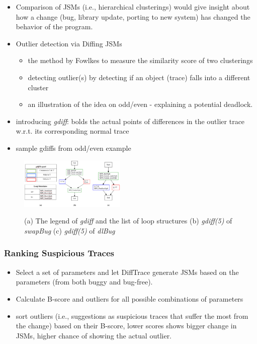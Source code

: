\begin{itemize}
	\item Comparison of JSMs (i.e., hierarchical clusterings) would give insight about how a change (bug, library update, porting to new system) has changed the behavior of the program.
	\item Outlier detection via Diffing JSMs
	\begin{itemize}
		\item the method by Fowlkes to measure the similarity score of two clusterings
		\item detecting outlier(s) by detecting if an object (trace) falls into a different cluster 
		\item an illustration of the idea on odd/even - explaining a potential deadlock.
	\end{itemize}
	\item introducing \textit{gdiff}: bolds the actual points of differences in the outlier trace w.r.t. its corresponding normal trace
	\item sample gdiffs from odd/even example
	
\end{itemize}

\begin{figure}[]
\centering
\caption{(a) The legend of \textit{gdiff} and the list of loop structures (b) \textit{gdiff(5)} of \textit{swapBug} (c) \textit{gdiff(5)} of \textit{dlBug}}
\includegraphics[width=0.45\textwidth]{figs/sampleGdiff.png}
\label{fig.gdiffs}
\end{figure}



\subsubsection{Ranking Suspicious Traces}
\begin{itemize}
	\item Select a set of parameters and let DiffTrace generate JSMs based on the parameters (from both buggy and bug-free).
	\item Calculate B-score and outliers for all possible combinations of parameters
	\item sort outliers (i.e., suggestions as suspicious traces that suffer the most from the change) based on their B-score, lower scores shows bigger change in JSMs, higher chance of showing the actual outlier.
\end{itemize}

